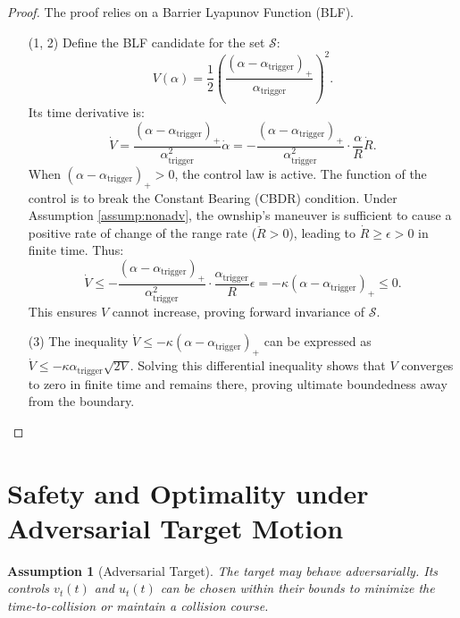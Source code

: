 \documentclass[10pt]{article}
\theoremstyle{plain}
\newtheorem{assumption}{Assumption}
\begin{document}
\begin{proof}
    The proof relies on a Barrier Lyapunov Function (BLF).
    \begin{enumerate}
        \item[(1, 2)] Define the BLF candidate for the set $\mathcal{S}$:
        \[
        V(\alpha) = \frac{1}{2} \left( \frac{(\alpha - \alpha_{\text{trigger}})_+}{\alpha_{\text{trigger}}} \right)^2.
        \]
        Its time derivative is:
        \[
        \dot{V} = \frac{(\alpha - \alpha_{\text{trigger}})_+}{\alpha_{\text{trigger}}^2} \dot{\alpha} = -\frac{(\alpha - \alpha_{\text{trigger}})_+}{\alpha_{\text{trigger}}^2} \cdot \frac{\alpha}{R} \dot{R}.
        \]
        When $(\alpha - \alpha_{\text{trigger}})_+ > 0$, the control law is active. The function of the control is to break the Constant Bearing (CBDR) condition. Under Assumption \ref{assump:nonadv}, the ownship's maneuver is sufficient to cause a positive rate of change of the range rate ($\ddot{R} > 0$), leading to $\dot{R} \geq \epsilon > 0$ in finite time. Thus:
        \[
        \dot{V} \leq -\frac{(\alpha - \alpha_{\text{trigger}})_+}{\alpha_{\text{trigger}}^2} \cdot \frac{\alpha_{\text{trigger}}}{R} \epsilon = -\kappa (\alpha - \alpha_{\text{trigger}})_+ \leq 0.
        \]
        This ensures $V$ cannot increase, proving forward invariance of $\mathcal{S}$.
        \item[(3)] The inequality $\dot{V} \leq -\kappa (\alpha - \alpha_{\text{trigger}})_+$ can be expressed as $\dot{V} \leq -\kappa \alpha_{\text{trigger}} \sqrt{2V}$. Solving this differential inequality shows that $V$ converges to zero in finite time and remains there, proving ultimate boundedness away from the boundary.
    \end{enumerate}
\end{proof}

\section{Safety and Optimality under Adversarial Target Motion}

\begin{assumption}[Adversarial Target]\label{assump:adv}
    The target may behave adversarially. Its controls $v_t(t)$ and $u_t(t)$ can be chosen within their bounds to minimize the time-to-collision or maintain a collision course.
\end{assumption}
\end{document}
